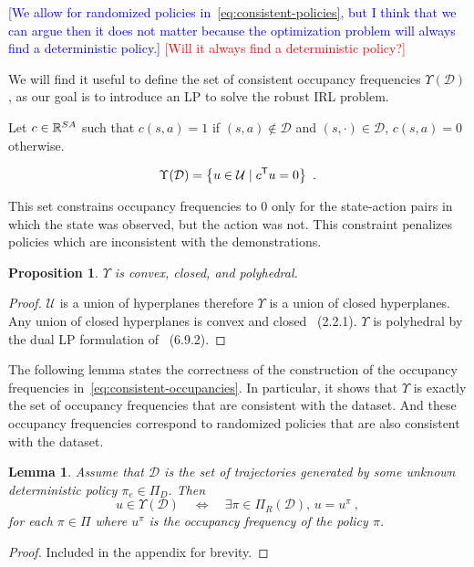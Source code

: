 \documentclass[11pt]{article}
\newtheorem{lemma}{Lemma}
\newtheorem{proposition}{Proposition}
\newcommand{\mm}[1]{\textcolor{blue}{[#1]}}
\newcommand{\gersi}[1]{\textcolor{red}{[#1]}}
\begin{document}
\mm{We allow for randomized policies in~\eqref{eq:consistent-policies}, but I
	think that we can argue then it does not matter because the optimization problem
	will always find a deterministic policy.}
\gersi{Will it always find a deterministic policy?}

We will find it useful to define the set of consistent occupancy frequencies $\Upsilon(\mathcal{D})$, as our goal is to introduce an LP to solve
the robust IRL problem.

Let $c \in \mathbb{R}^{SA}$ such that $c(s,a) = 1$ if $(s,a) \notin \mathcal{D}$ and $(s, \cdot) \in \mathcal{D}$, $c(s,a)  = 0$ otherwise.

\begin{equation}\label{eq:consistent-occupancies}
	\Upsilon(\mathcal{D}) = \left\{ u \in \mathcal{U} \mid c^{\mathsf{T}} u = 0  \right\}~.
\end{equation}

This set constrains occupancy frequencies to 0 only for the state-action pairs in which the state was observed, but the action was not. 
This constraint penalizes policies which are inconsistent with the demonstrations.

\begin{proposition}\label{prop:convexity_of_Upsilon}
	$\Upsilon$ is convex, closed, and polyhedral. 
\end{proposition}

\begin{proof}
	$\mathcal{U}$ is a union of hyperplanes therefore $\Upsilon$ is a union of
	closed hyperplanes. Any union of closed hyperplanes is convex and closed~\cite{boyd_convex_optimization} (2.2.1).
	$\Upsilon$ is polyhedral by the dual LP formulation of~\cite{PUTERMAN} (6.9.2).
\end{proof}

The following lemma states the correctness of the construction of the occupancy
frequencies in~\eqref{eq:consistent-occupancies}. In particular, it shows that
$\Upsilon$ is exactly the set of occupancy frequencies that are consistent with the
dataset. And these occupancy frequencies correspond to randomized policies that are also consistent with the dataset.

\begin{lemma}\label{lemma:occ_freq_matching}
	Assume that $\mathcal{D}$ is the set of trajectories generated by some unknown deterministic policy $\pi_e \in \Pi_D$. Then
	\[
		u \in \Upsilon(\mathcal{D})  \quad \Leftrightarrow \quad  \exists \pi \in \Pi_R(\mathcal{D}), \, u = u^{\pi}~,
	\]
	for each $\pi \in \Pi$ where $u^{\pi}$ is the occupancy frequency of the policy $\pi$.
\end{lemma}
\begin{proof}
	Included in the appendix for brevity.
\end{proof}
\end{document}
